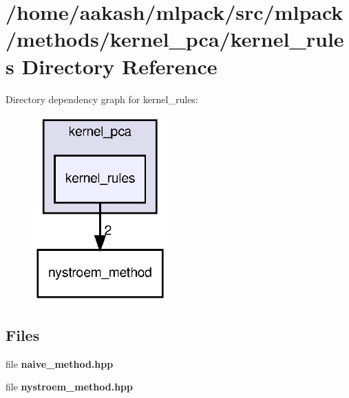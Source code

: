 \section{/home/aakash/mlpack/src/mlpack/methods/kernel\+\_\+pca/kernel\+\_\+rules Directory Reference}
\label{dir_702d0be5535d6df644d10e1014296a0d}
Directory dependency graph for kernel\+\_\+rules\+:
\nopagebreak
\begin{figure}[H]
\begin{center}
\leavevmode
\includegraphics[width=146pt]{dir_702d0be5535d6df644d10e1014296a0d_dep}
\end{center}
\end{figure}
\subsection*{Files}
\begin{DoxyCompactItemize}
\item 
file \textbf{ naive\+\_\+method.\+hpp}
\item 
file \textbf{ nystroem\+\_\+method.\+hpp}
\end{DoxyCompactItemize}
